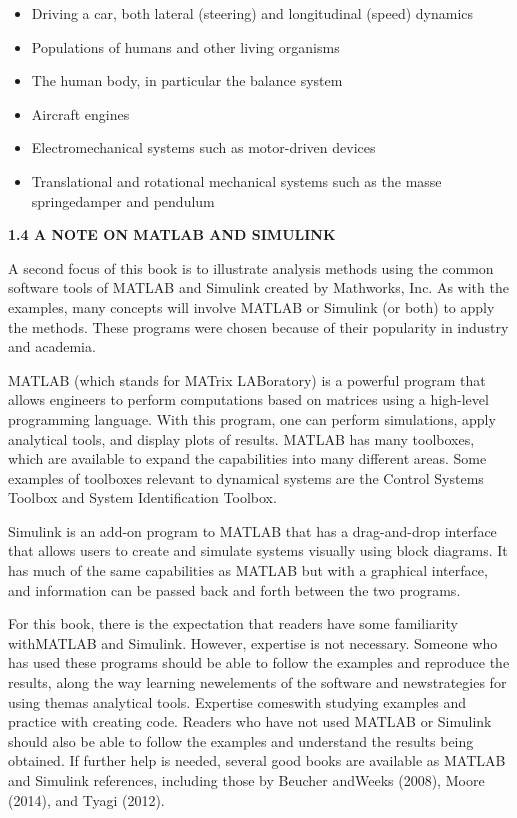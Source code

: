 \documentclass[12pt]{article}
\begin{document}
\begin{itemize}
\item Driving a car, both lateral (steering) and longitudinal (speed) dynamics
\item Populations of humans and other living organisms
\item The human body, in particular the balance system
\item Aircraft engines
\item Electromechanical systems such as motor-driven devices
\item Translational and rotational mechanical systems such as the masse
springedamper and pendulum
\end{itemize}

\hfill

\textbf{1.4 A NOTE ON MATLAB AND SIMULINK}

\hfill

A second focus of this book is to illustrate analysis methods using the
common software tools of MATLAB and Simulink created by Mathworks,
Inc. As with the examples, many concepts will involve MATLAB or
Simulink (or both) to apply the methods. These programs were chosen
because of their popularity in industry and academia.

MATLAB (which stands for MATrix LABoratory) is a powerful program
that allows engineers to perform computations based on matrices
using a high-level programming language. With this program, one can
perform simulations, apply analytical tools, and display plots of results.
MATLAB has many toolboxes, which are available to expand the capabilities
into many different areas. Some examples of toolboxes relevant to
dynamical systems are the Control Systems Toolbox and System Identification
Toolbox.


Simulink is an add-on program to MATLAB that has a drag-and-drop
interface that allows users to create and simulate systems visually using block
diagrams. It has much of the same capabilities as MATLAB but with a
graphical interface, and information can be passed back and forth between
the two programs.

For this book, there is the expectation that readers have some familiarity
withMATLAB and Simulink. However, expertise is not necessary. Someone
who has used these programs should be able to follow the examples and
reproduce the results, along the way learning newelements of the software and
newstrategies for using themas analytical tools. Expertise comeswith studying
examples and practice with creating code. Readers who have not used
MATLAB or Simulink should also be able to follow the examples and
understand the results being obtained. If further help is needed, several good
books are available as MATLAB and Simulink references, including those by
Beucher andWeeks (2008), Moore (2014), and Tyagi (2012).
\end{document}
